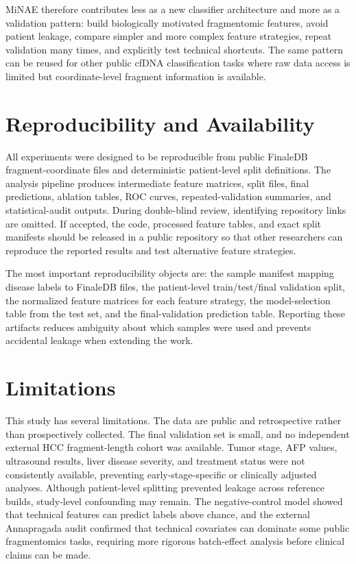 \documentclass[conference]{IEEEtran}
\begin{document}
MiNAE therefore contributes less as a new classifier architecture and more as a validation pattern: build biologically motivated fragmentomic features, avoid patient leakage, compare simpler and more complex feature strategies, repeat validation many times, and explicitly test technical shortcuts. The same pattern can be reused for other public cfDNA classification tasks where raw data access is limited but coordinate-level fragment information is available.

\section{Reproducibility and Availability}
All experiments were designed to be reproducible from public FinaleDB fragment-coordinate files and deterministic patient-level split definitions. The analysis pipeline produces intermediate feature matrices, split files, final predictions, ablation tables, ROC curves, repeated-validation summaries, and statistical-audit outputs. During double-blind review, identifying repository links are omitted. If accepted, the code, processed feature tables, and exact split manifests should be released in a public repository so that other researchers can reproduce the reported results and test alternative feature strategies.

The most important reproducibility objects are: the sample manifest mapping disease labels to FinaleDB files, the patient-level train/test/final validation split, the normalized feature matrices for each feature strategy, the model-selection table from the test set, and the final-validation prediction table. Reporting these artifacts reduces ambiguity about which samples were used and prevents accidental leakage when extending the work.

\section{Limitations}
This study has several limitations. The data are public and retrospective rather than prospectively collected. The final validation set is small, and no independent external HCC fragment-length cohort was available. Tumor stage, AFP values, ultrasound results, liver disease severity, and treatment status were not consistently available, preventing early-stage-specific or clinically adjusted analyses. Although patient-level splitting prevented leakage across reference builds, study-level confounding may remain. The negative-control model showed that technical features can predict labels above chance, and the external Annapragada audit confirmed that technical covariates can dominate some public fragmentomics tasks, requiring more rigorous batch-effect analysis before clinical claims can be made.
\end{document}
